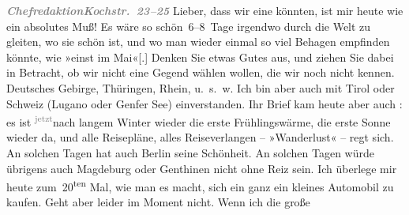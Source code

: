 \pstart
           \textcolor{gray}{\textbf{\emph{Chefredaktion}}}\hfill \textcolor{gray}{\textbf{\emph{Kochstr. 23–25}}}\pend
           \vspace{0.5em}
\pstart
           Lieber, dass wir eine \label{K_L03416-1v}\label{K_L03416-1} könnten, ist
               mir heute wie ein absolutes Muß! Es wäre so schön 6–8 Tage irgendwo durch die Welt zu
               gleiten, wo sie schön ist, und wo man wieder einmal so viel Behagen empfinden könnte,
               wie »einst im Mai«{[}.{]} Denken Sie etwas Gutes aus, und ziehen Sie
               dabei in Betracht, ob wir nicht eine Gegend wählen wollen, die wir noch nicht kennen.
               Deutsches Gebirge, Thüringen, Rhein, u. s. w. Ich bin aber auch mit Tirol oder Schweiz (Lugano oder Genfer See) einverstanden. Ihr Brief kam heute aber auch \label{K_L03416-2v}\label{K_L03416-2}: es
               ist \substVorne{}\textsuperscript{\textcolor{gray}{jetzt}}\substDazwischen{}nach\substHinten{} langem Winter wieder die erste Frühlingswärme, die erste Sonne wieder da,
               und alle Reisepläne, alles Reiseverlangen – »Wanderlust« – regt sich. An solchen
               Tagen hat auch Berlin seine Schönheit. An solchen
               Tagen würde übrigens auch Magdeburg oder Genthinen nicht ohne Reiz sein. Ich überlege mir
               heute zum 20\textsuperscript{ten} Mal, wie man es macht, sich ein ganz ein
               kleines Automobil zu kaufen. Geht aber leider im Moment nicht. Wenn ich die große
